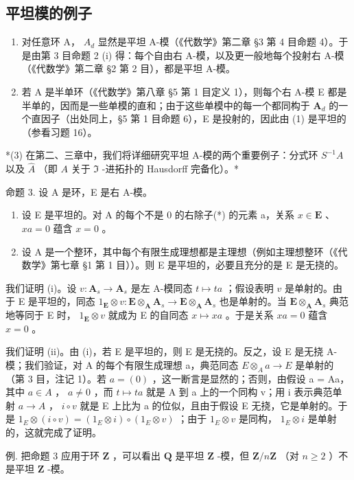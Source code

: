 \subsection{平坦模的例子}

\begin{enumerate}
\def\labelenumi{(\arabic{enumi})}
\item
  对任意环 A， \(A_{d}\) 显然是平坦 A-模（《代数学》第二章 §3 第 4 目命题 4）。于是由第 3 目命题 2 (i) 得：每个自由右 A-模，以及更一般地每个投射右 A-模（《代数学》第二章 §2 第 2 目），都是平坦 A-模。
\item
  若 A 是半单环（《代数学》第八章 §5 第 1 目定义 1），则每个右 A-模 E 都是半单的，因而是一些单模的直和；由于这些单模中的每一个都同构于 \(\mathbf{A}_d\) 的一个直因子（出处同上，§5 第 1 目命题 6），E 是投射的，因此由 (1) 是平坦的（参看习题 16）。
\end{enumerate}

*(3) 在第二、三章中，我们将详细研究平坦 A-模的两个重要例子：分式环 \(S^{-1}A\) 以及 \(\hat{A}\) （即 \(A\) 关于 \(\mathfrak{I}\) -进拓扑的 Hausdorff 完备化）。*

命题 3. 设 A 是环，E 是右 A-模。

\begin{enumerate}
\def\labelenumi{(\roman{enumi})}
\item
  设 E 是平坦的。对 A 的每个不是 0 的右除子(*) 的元素 a，关系 \(x \in \mathbf{E}\) 、 \(xa = 0\) 蕴含 \(x = 0\) 。
\item
  设 A 是一个整环，其中每个有限生成理想都是主理想（例如主理想整环（《代数学》第七章 §1 第 1 目））。则 E 是平坦的，必要且充分的是 E 是无挠的。
\end{enumerate}

我们证明 (i)。设 \(v: \mathbf{A}_s \to \mathbf{A}_s\) 是左 A-模同态 \(t \mapsto ta\) ；假设表明 \(v\) 是单射的。由于 E 是平坦的，同态 \(1_{\mathbf{E}} \otimes v: \mathbf{E} \otimes_{\mathbf{A}} \mathbf{A}_s \to \mathbf{E} \otimes_{\mathbf{A}} \mathbf{A}_s\) 也是单射的。当 \(\mathbf{E} \otimes_{\mathbf{A}} \mathbf{A}_s\) 典范地等同于 E 时， \(1_{\mathbf{E}} \otimes v\) 就成为 E 的自同态 \(x \mapsto xa\) 。于是关系 \(xa = 0\) 蕴含 \(x = 0\) 。

我们证明 (ii)。由 (i)，若 E 是平坦的，则 E 是无挠的。反之，设 E 是无挠 A-模；我们验证，对 A 的每个有限生成理想 a，典范同态 \(E \otimes_{A} a \to E\) 是单射的（第 3 目，注记 1）。若 \(a = (0)\) ，这一断言是显然的；否则，由假设 a = Aa，其中 \(a \in A\) ， \(a \neq 0\) ，而 \(t \mapsto ta\) 就是 A 到 a 上的一个同构 v；用 i 表示典范单射 \(a \to A\) ， \(i \circ v\) 就是 E 上比为 a 的位似，且由于假设 E 无挠，它是单射的。于是 \(1_{E} \otimes (i \circ v) = (1_{E} \otimes i) \circ (1_{E} \otimes v)\) ；由于 \(1_{E} \otimes v\) 是同构， \(1_{E} \otimes i\) 是单射的，这就完成了证明。

例. 把命题 3 应用于环 \(\mathbf{Z}\) ，可以看出 \(\mathbf{Q}\) 是平坦 \(\mathbf{Z}\) -模，但 \(\mathbf{Z}/n\mathbf{Z}\) （对 \(n \geqslant 2\) ）不是平坦 \(\mathbf{Z}\) -模。

